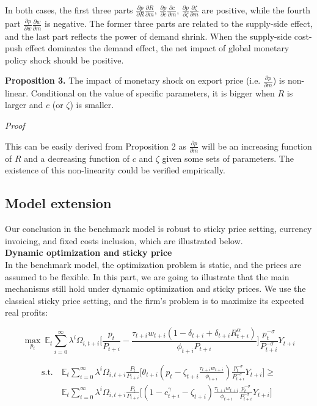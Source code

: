 In both cases, the first three parts $\frac{\partial p}{\partial R}\frac{\partial R}{\partial m}$, $\frac{\partial p}{\partial c}\frac{\partial c}{\partial m}$, $\frac{\partial p}{\partial \zeta}\frac{\partial \zeta}{\partial m}$ are positive, while the fourth part $\frac{\partial p}{\partial w}\frac{\partial w}{\partial m} $ is negative. The former three parts are related to the supply-side effect, and the last part reflects the power of demand shrink. When the supply-side cost-push effect dominates the demand effect, the net impact of global monetary policy shock should be positive. 

\textbf{Proposition 3.} The impact of monetary shock on export price (i.e. $\frac{\partial p}{\partial m}$) is non-linear. Conditional on the value of specific parameters, it is bigger when $R$ is larger and $c$ (or $\zeta$) is smaller.

\textit{Proof}

This can be easily derived from Proposition 2 as $\frac{\partial p}{\partial m}$ will be an increasing function of $R$ and a decreasing function of $c$ and $\zeta$ given some sets of parameters. The existence of this non-linearity could be verified empirically.


\subsection{Model extension}

Our conclusion in the benchmark model is robust to sticky price setting, currency invoicing, and fixed costs inclusion, which are illustrated below. \\

\textbf{Dynamic optimization and sticky price} \\

In the benchmark model, the optimization problem is static, and the prices are assumed to be flexible. In this part, we are going to illustrate that the main mechanisms still hold under dynamic optimization and sticky prices. We use the classical \cite{calvo1983staggered} sticky price setting, and the firm's problem is to maximize its expected real profits:

$$
\max_{p_t} \ \mathbb{E}_t \sum_{i=0}^{\infty} \lambda^i \Omega_{i,t+i} \biggr[ \frac{p_t}{P_{t+i}}-\frac{\tau_{t+i} w_{t+i}(1-\delta_{t+i}+\delta_{t+i} R_{t+i}^\alpha)}{\phi_{t+i}P_{t+i}} \biggr] \frac{p_t^{-\sigma}}{P_{t+i}^{-\sigma}}Y_{t+i}
$$

\begin{align*}
\text{s.t.} \ &\mathbb{E}_t \sum_{i=0}^{\infty} \lambda^i \Omega_{i,t+i} \frac{P_t}{P_{t+i}} \biggr[ \theta_{t+i} (p_t-\zeta_{t+i} \frac{\tau_{t+i} w_{t+i}}{\phi_{t+i}}) \frac{p_t^{-\sigma}}{P_{t+i}^{-\sigma}}Y_{t+i} \biggr] \geq  \\
 &\mathbb{E}_t \sum_{i=0}^{\infty} \lambda^i \Omega_{i,t+i} \frac{P_t}{P_{t+i}} \biggr[(1-c_{t+i}^{\gamma}-\zeta_{t+i}) \frac{\tau_{t+i} w_{t+i}}{\phi_{t+i}} \frac{p_t^{-\sigma}}{P_{t+i}^{-\sigma}}Y_{t+i}\biggr]    
\end{align*}

